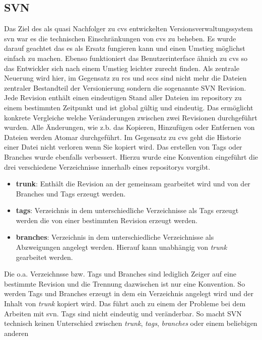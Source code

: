 \subsection{SVN}
Das Ziel des als quasi Nachfolger zu \acrshort{cvs} entwickelten
Versionsverwaltungssystem \acrfull{svn} war es die technischen Einschränkungen
von \acrshort{cvs} zu beheben. Es wurde darauf geachtet das es als Ersatz
fungieren kann und einen Umstieg möglichst einfach zu machen. Ebenso
funktioniert das Benutzerinterface ähnich zu \acrshort{cvs} so das Entwickler
sich nach einem Umstieg leichter zurecht finden. Als zentrale Neuerung wird
hier, im Gegensatz zu \acrshort{rcs} und \acrshort{sccs} sind nicht mehr die
Dateien zentraler Bestandteil der Versionierung sondern die sogenannte SVN
Revision. Jede Revision enthält einen eindeutigen Stand aller Dateien im
\gls{repository} zu einem bestimmten Zeitpunkt und ist global gültig und
eindeutig. Das ermöglicht konkrete Vergleiche welche Veränderungen zwischen
zwei Revisionen durchgeführt wurden. Alle Änderungen, wie z.b. das Kopieren,
Hinzufügen oder Entfernen von Dateien werden Atomar durchgeführt. Im Gegensatz
zu \acrshort{cvs} geht die Historie einer Datei nicht verloren wenn Sie kopiert
wird. Das erstellen von Tags oder Branches wurde ebenfalls verbessert. Hierzu wurde eine Konvention eingeführt die drei verschiedene Verzeichnisse innerhalb eines \glspl{repository} vorgibt.
\begin{itemize}
\item \textbf{trunk}: Enthält die Revision an der gemeinsam gearbeitet wird
       und von der Branches und Tags erzeugt werden.
\item \textbf{tags}: Verzeichnis in dem unterschiedliche Verzeichnisse als
       Tags erzeugt werden die von einer bestimmten Revision erzeugt werden.
\item \textbf{branches}: Verzeichnis in dem unterschiedliche Verzeichnisse als
      Abzweigungen angelegt werden. Hierauf kann unabhängig von \textit{trunk}
      gearbeitet werden.
\end{itemize}
Die o.a. Verzeichnsse bzw. Tags und Branches sind lediglich Zeiger auf eine
bestimmte Revision und die Trennung dazwischen ist nur eine Konvention. So
werden Tags und Branches erzeugt in dem ein Verzeichnis angelegt wird und der
Inhalt von \textit{trunk} kopiert wird. Das führt auch zu einem der Probleme bei dem
Arbeiten mit \acrlong{svn}. Tags sind nicht eindeutig und veränderbar. So macht
SVN technisch keinen Unterschied zwischen \textit{trunk},
\textit{tags}, \textit{branches} oder einem beliebigen anderen
